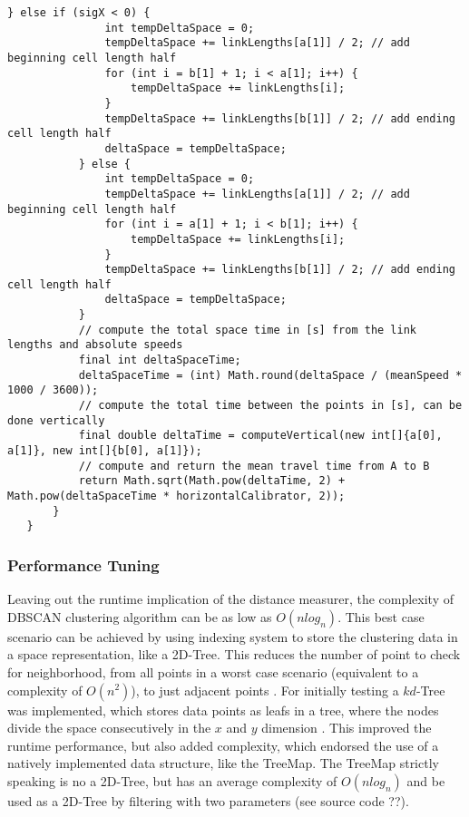 \begin{lstlisting}[basicstyle=\tiny, style=java, caption={diagonal distance calculation}, label=lst:distance_calc_diagonal]
		   } else if (sigX < 0) {
			   int tempDeltaSpace = 0;
			   tempDeltaSpace += linkLengths[a[1]] / 2; // add beginning cell length half
			   for (int i = b[1] + 1; i < a[1]; i++) {
				   tempDeltaSpace += linkLengths[i];
			   }
			   tempDeltaSpace += linkLengths[b[1]] / 2; // add ending cell length half
			   deltaSpace = tempDeltaSpace;
		   } else {
			   int tempDeltaSpace = 0;
			   tempDeltaSpace += linkLengths[a[1]] / 2; // add beginning cell length half
			   for (int i = a[1] + 1; i < b[1]; i++) {
				   tempDeltaSpace += linkLengths[i];
			   }
			   tempDeltaSpace += linkLengths[b[1]] / 2; // add ending cell length half
			   deltaSpace = tempDeltaSpace;
		   }
		   // compute the total space time in [s] from the link lengths and absolute speeds
		   final int deltaSpaceTime;
		   deltaSpaceTime = (int) Math.round(deltaSpace / (meanSpeed * 1000 / 3600));
		   // compute the total time between the points in [s], can be done vertically
		   final double deltaTime = computeVertical(new int[]{a[0], a[1]}, new int[]{b[0], a[1]});
		   // compute and return the mean travel time from A to B
		   return Math.sqrt(Math.pow(deltaTime, 2) + Math.pow(deltaSpaceTime * horizontalCalibrator, 2));
	   }
   }
\end{lstlisting}


\subsubsection{Performance Tuning}
Leaving out the runtime implication of the distance measurer, the complexity of DBSCAN clustering algorithm can be as low as $O(nlog_n)$. This best case scenario can be achieved by using indexing system to store the clustering data in a space representation, like a 2D-Tree. This reduces the number of point to check for neighborhood, from all points in a worst case scenario (equivalent to a complexity of $O(n^2)$), to just adjacent points \parencite{Chauhan2020}. For initially testing a $kd$-Tree was implemented, which stores data points as leafs in a tree, where the nodes divide the space consecutively in the $x$ and $y$ dimension \parencite{Hucker2020,Dalitz2009}. This improved the runtime performance, but also added complexity, which endorsed the use of a natively implemented data structure, like the TreeMap. The TreeMap strictly speaking is no a 2D-Tree, but has an average complexity of $O(nlog_n)$ and be used as a 2D-Tree by filtering with two parameters (see source code ??). \parencite{Baeldung2020_1,Baeldung2020_2}


